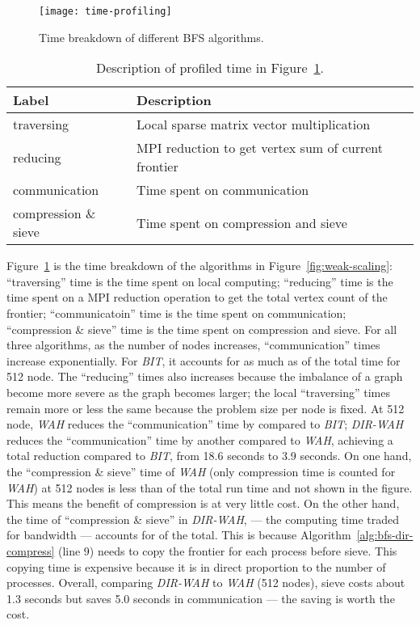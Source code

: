 \documentclass[conference]{IEEEtran}
\begin{document}
\begin{figure}[t]
  \centering
  \texttt{[image: time-profiling]}
  \caption{Time breakdown of different BFS algorithms.}
  \label{fig:time-profiling}
\end{figure}
\begin{table}[t]
  \label{table:time-profiling}
  \caption{Description of profiled time in Figure~\ref{fig:time-profiling}.}
  \begin{center}
    \begin{tabular}{ll}
      \toprule Label & Description \\ 
\midrule
      traversing & Local sparse matrix vector multiplication \\
      reducing & MPI reduction to get vertex sum of current frontier\\
      communication & Time spent on communication \\
      compression \& sieve & Time spent on compression and sieve \\
\bottomrule
    \end{tabular}
  \end{center}
\end{table}
Figure~\ref{fig:time-profiling} is the time breakdown of the algorithms in
Figure~\ref{fig:weak-scaling}: ``traversing'' time is the time spent on local
computing; ``reducing'' time is the time spent on a MPI reduction operation to
get the total vertex count of the frontier; ``communicatoin'' time is the time
spent on communication; ``compression \& sieve'' time is the time spent on
compression and sieve.  For all three algorithms, as the number of nodes
increases, ``communication'' times increase exponentially.  For \textit{BIT},
it accounts for as much as  of the total time for 512 node.  The
``reducing'' times also increases because the imbalance of a graph become more
severe as the graph becomes larger; the local ``traversing'' times remain more
or less the same because the problem size per node is fixed. At 512 node,
\textit{WAH} reduces the ``communication'' time by  compared to
\textit{BIT}; \textit{DIR-WAH} reduces the ``communication'' time by another
 compared to \textit{WAH}, achieving a total  reduction
compared to \textit{BIT}, from 18.6 seconds to 3.9 seconds. On one hand, the
``compression \& sieve'' time of \textit{WAH} (only compression time is
counted for \textit{WAH}) at 512 nodes is less than  of the total run
time and not shown in the figure. This means the benefit of compression is at
very little cost. On the other hand, the time of ``compression \& sieve'' in
\textit{DIR-WAH}, --- the computing time traded for bandwidth --- accounts for
 of the total.  This is because Algorithm~\ref{alg:bfs-dir-compress}
(line 9) needs to copy the frontier for each process before sieve. This
copying time is expensive because it is in direct proportion to the number of
processes. Overall, comparing \textit{DIR-WAH} to \textit{WAH} (512 nodes),
sieve costs about 1.3 seconds but saves 5.0 seconds in communication --- the
saving is worth the cost.
\end{document}
